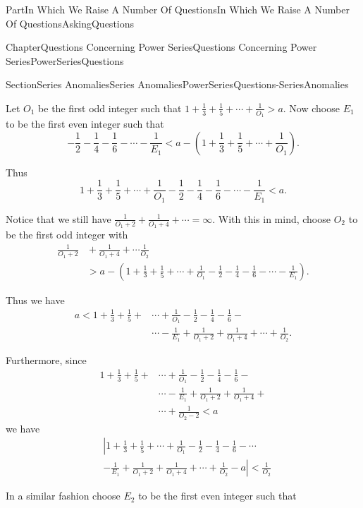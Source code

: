 \documentclass[oneside,10pt,]{book}
\numberwithin{equation}{part}
\newcommand{\lt}{<}
\newcommand{\gt}{>}
\newcommand{\amp}{&}
\begin{document}
\begin{partptx}{Part}{In Which We Raise A Number Of Questions}{}{In Which We Raise A Number Of Questions}{}{}{AskingQuestions}
\begin{chapterptx}{Chapter}{Questions Concerning Power Series}{}{Questions Concerning Power Series}{}{}{PowerSeriesQuestions}
\begin{sectionptx}{Section}{Series Anomalies}{}{Series Anomalies}{}{}{PowerSeriesQuestions-SeriesAnomalies}
\par
Let \(O_1\) be the first odd integer such that \(1+\frac{1}{3}+\frac{1}{5}+\cdots+\frac{1}{O_1}>a\). Now choose \(E_1\) to be the first even integer such that%
\begin{equation*}
-\frac{1}{2}-\frac{1}{4}-\frac{1}{6}-\cdots-\frac{1}{E_1} \lt a-\left(1+\frac{1}{3}+\frac{1}{5}+\cdots+\frac{1}{O_1}\right)\text{.}
\end{equation*}
%
\par
Thus%
\begin{equation*}
1+\frac{1}{3}+\frac{1}{5}+\cdots+\frac{1}{O_1}-\frac{1}{2}-\frac{1}{4} - \frac{1}{6}-\cdots-\frac{1}{E_1}\lt a\text{.}
\end{equation*}
%
\par
Notice that we still have \(\frac{1}{O_1+2}+\frac{1}{O_1+4}+\cdots=\infty\). With this in mind, choose \(O_2\) to be the first odd integer with%
\begin{align*}
\frac{1}{O_1+2}\amp{}+\frac{1}{O_1+4}+\cdots\frac{1}{O_2}\\
\amp{}\gt          a-\left(1+\frac{1}{3}+
\frac{1}{5}+\cdots+\frac{1}{O_1}-\frac{1}{2}-\frac{1}{4}-\frac{1}{6}-\cdots-
\frac{1}{E_1}\right).
\end{align*}
%
\par
Thus we have%
\begin{align*}
a\lt
1+\frac{1}{3}+\frac{1}{5}+\amp{}\cdots+\frac{1}{O_1}-\frac{1}{2}-\frac{1}{4}-
\frac{1}{6}-\\
\amp{}\cdots-\frac{1}{E_1}+\frac{1}{O_1+2}+\frac{1}{O_1+4}+\cdots+
\frac{1}{O_2}.
\end{align*}
%
\par
Furthermore, since%
\begin{align*}
1+\frac{1}{3}+\frac{1}{5}+\amp{}\cdots+\frac{1}{O_1}-\frac{1}{2}-\frac{1}{4}-
\frac{1}{6}-\\
\amp{}\cdots-\frac{1}{E_1}+\frac{1}{O_1+2}+\frac{1}{O_1+4}+\\
\amp{}\cdots+ \frac{1}{O_2-2}\lt a
\end{align*}
we have%
\begin{align*}
\amp{}\left|1+\frac{1}{3}+\frac{1}{5}+\cdots+\frac{1}{O_1}-\frac{1}{2}-\frac{1}{4}- \frac{1}{6}-\cdots\right.\\
\amp \left.-\frac{1}{E_1}+\frac{1}{O_1+2}+\frac{1}{O_1+4}+\cdots+ \frac{1}{O_2}-a\right|\lt \frac{1}{O_2}
\end{align*}
%
\par
In a similar fashion choose \(E_2\) to be the first even integer such that%

\end{sectionptx}
\end{chapterptx}
\end{partptx}
\end{document}
